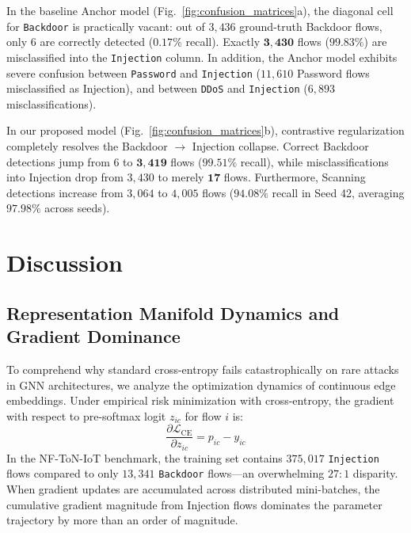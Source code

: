 \documentclass[journal,onecolumn]{IEEEtran}
\begin{document}
In the baseline Anchor model (Fig.~\ref{fig:confusion_matrices}a), the diagonal cell for \texttt{Backdoor} is practically vacant: out of $3,436$ ground-truth Backdoor flows, only $6$ are correctly detected ($0.17\%$ recall). Exactly $\mathbf{3,430}$ flows ($99.83\%$) are misclassified into the \texttt{Injection} column. In addition, the Anchor model exhibits severe confusion between \texttt{Password} and \texttt{Injection} ($11,610$ Password flows misclassified as Injection), and between \texttt{DDoS} and \texttt{Injection} ($6,893$ misclassifications).

In our proposed model (Fig.~\ref{fig:confusion_matrices}b), contrastive regularization completely resolves the Backdoor $\to$ Injection collapse. Correct Backdoor detections jump from $6$ to $\mathbf{3,419}$ flows ($99.51\%$ recall), while misclassifications into Injection drop from $3,430$ to merely $\mathbf{17}$ flows. Furthermore, Scanning detections increase from $3,064$ to $4,005$ flows ($94.08\%$ recall in Seed 42, averaging $97.98\%$ across seeds).

\section{Discussion}
\label{sec:discussion}

\subsection{Representation Manifold Dynamics and Gradient Dominance}
To comprehend why standard cross-entropy fails catastrophically on rare attacks in GNN architectures, we analyze the optimization dynamics of continuous edge embeddings. Under empirical risk minimization with cross-entropy, the gradient with respect to pre-softmax logit $z_{ic}$ for flow $i$ is:
\begin{equation}
\frac{\partial \mathcal{L}_{\text{CE}}}{\partial z_{ic}} = p_{ic} - y_{ic}
\label{eq:ce_gradient}
\end{equation}
In the NF-ToN-IoT benchmark, the training set contains $375,017$ \texttt{Injection} flows compared to only $13,341$ \texttt{Backdoor} flows—an overwhelming $27:1$ disparity. When gradient updates are accumulated across distributed mini-batches, the cumulative gradient magnitude from Injection flows dominates the parameter trajectory by more than an order of magnitude. 
\end{document}

